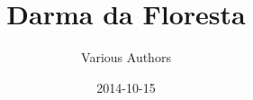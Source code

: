 \documentclass[
  final,
  pagePreset=largepage,
  babelLanguage=portuguese,
]{anecdote}
\title{Darma da Floresta}
\subtitle{}
\author{Various Authors}
\date{2014-10-15}
\begin{document}
\frontmatter

\cleartorecto
\tableofcontents*







\mainmatter
\book{\thetitle}





%
%
%
%
%
%
%
%
%
%
%
%
%









%
%
%
%
%
%
%
%
%
%
%
%
%
%
%
%
%
%
\end{document}
